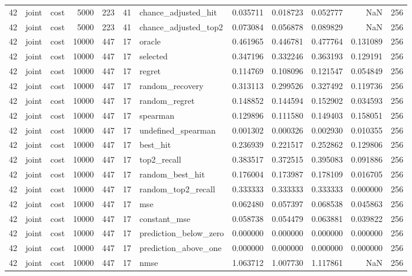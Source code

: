 \begin{tabular}{rllrrrlrrrrr}
42 & joint & cost & 5000 & 223 & 41 & chance_adjusted_hit & 0.035711 & 0.018723 & 0.052777 & NaN & 256 \\
42 & joint & cost & 5000 & 223 & 41 & chance_adjusted_top2 & 0.073084 & 0.056878 & 0.089829 & NaN & 256 \\
42 & joint & cost & 10000 & 447 & 17 & oracle & 0.461965 & 0.446781 & 0.477764 & 0.131089 & 256 \\
42 & joint & cost & 10000 & 447 & 17 & selected & 0.347196 & 0.332246 & 0.363193 & 0.129191 & 256 \\
42 & joint & cost & 10000 & 447 & 17 & regret & 0.114769 & 0.108096 & 0.121547 & 0.054849 & 256 \\
42 & joint & cost & 10000 & 447 & 17 & random_recovery & 0.313113 & 0.299526 & 0.327492 & 0.119736 & 256 \\
42 & joint & cost & 10000 & 447 & 17 & random_regret & 0.148852 & 0.144594 & 0.152902 & 0.034593 & 256 \\
42 & joint & cost & 10000 & 447 & 17 & spearman & 0.129896 & 0.111580 & 0.149403 & 0.158051 & 256 \\
42 & joint & cost & 10000 & 447 & 17 & undefined_spearman & 0.001302 & 0.000326 & 0.002930 & 0.010355 & 256 \\
42 & joint & cost & 10000 & 447 & 17 & best_hit & 0.236939 & 0.221517 & 0.252862 & 0.129806 & 256 \\
42 & joint & cost & 10000 & 447 & 17 & top2_recall & 0.383517 & 0.372515 & 0.395083 & 0.091886 & 256 \\
42 & joint & cost & 10000 & 447 & 17 & random_best_hit & 0.176004 & 0.173987 & 0.178109 & 0.016705 & 256 \\
42 & joint & cost & 10000 & 447 & 17 & random_top2_recall & 0.333333 & 0.333333 & 0.333333 & 0.000000 & 256 \\
42 & joint & cost & 10000 & 447 & 17 & mse & 0.062480 & 0.057397 & 0.068538 & 0.045863 & 256 \\
42 & joint & cost & 10000 & 447 & 17 & constant_mse & 0.058738 & 0.054479 & 0.063881 & 0.039822 & 256 \\
42 & joint & cost & 10000 & 447 & 17 & prediction_below_zero & 0.000000 & 0.000000 & 0.000000 & 0.000000 & 256 \\
42 & joint & cost & 10000 & 447 & 17 & prediction_above_one & 0.000000 & 0.000000 & 0.000000 & 0.000000 & 256 \\
42 & joint & cost & 10000 & 447 & 17 & nmse & 1.063712 & 1.007730 & 1.117861 & NaN & 256 \\

\end{tabular}
